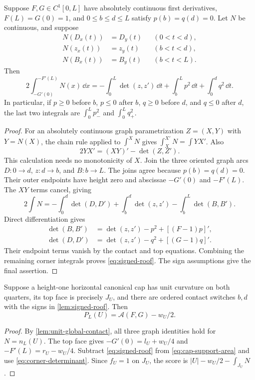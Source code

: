 \begin{lemma}\label{lem:signed-roof}
Suppose $F,G\in C^1[0,L]$ have absolutely continuous first derivatives,
$F(L)=G(0)=1$, and $0\le b\le d\le L$ satisfy $p(b)=q(d)=0$.
Let $N$ be continuous, and suppose
\[
 \begin{aligned}
 N(D_x(t))&=D_y(t)&& (0<t<d),\\
 N(z_x(t))&=z_y(t)&& (b<t<d),\\
 N(B_x(t))&=B_y(t)&& (b<t<L).
 \end{aligned}
\]
Then
\begin{equation}\label{eq:signed-roof}
 2\int_{-G'(0)}^{-F'(L)}N(x)\,\dd x
 =-\int_0^L\det(z,z')\,\dd t
         +\int_b^L p^2\,\dd t+\int_0^d q^2\,\dd t.
\end{equation}
In particular, if $p\ge0$ before $b$, $p\le0$ after $b$,
$q\ge0$ before $d$, and $q\le0$ after $d$, the last two integrals
are $\int_0^L p_-^2$ and $\int_0^L q_+^2$.
\end{lemma}
\begin{proof}
For an absolutely continuous graph parametrization $Z=(X,Y)$ with
$Y=N(X)$, the chain rule applied to $\int^X N$ gives
$\int_X^{X'}N=\int YX'$. Also
\[
 2YX'=(XY)'-\det(Z,Z').
\]
This calculation needs no monotonicity of $X$.
Join the three oriented graph arcs $D:0\to d$, $z:d\to b$,
and $B:b\to L$. The joins agree because $p(b)=q(d)=0$.
Their outer endpoints have height zero and abscissae $-G'(0)$ and
$-F'(L)$. The $XY$ terms cancel, giving
\[
 2\int N=-\int_0^d\det(D,D')
                  +\int_b^d\det(z,z')-\int_b^L\det(B,B').
\]
Direct differentiation gives
\[
 \begin{aligned}
 \det(B,B')&=\det(z,z')-p^2+[(F-1)p]',\\
 \det(D,D')&=\det(z,z')-q^2+[(G-1)q]'.
 \end{aligned}
\]
Their endpoint terms vanish by the contact and top equations.
Combining the remaining corner integrals proves
\cref{eq:signed-roof}. The sign assumptions give the final assertion.
\end{proof}

\begin{corollary}\label{cor:horizontal-score-identity}
Suppose a height-one horizontal canonical cap has unit curvature
on both quarters, its top face is precisely $J_U$, and there are
ordered contact switches $b,d$ with the signs in
\cref{lem:signed-roof}. Then
\[
 P_L(U)=\mathcal A(F,G)-w_U/2.
\]
\end{corollary}
\begin{proof}
By \cref{lem:unit-global-contact}, all three graph identities hold
for $N=n_L(U)$. The top face gives
$-G'(0)=l_U+w_U/4$ and $-F'(L)=r_U-w_U/4$.
Subtract \cref{eq:signed-roof} from \cref{eq:cap-support-area}
and use \cref{eq:corner-determinant}. Since $f_U=1$ on $J_U$,
the score is $|U|-w_U/2-\int_{J_U}N$.
\end{proof}

